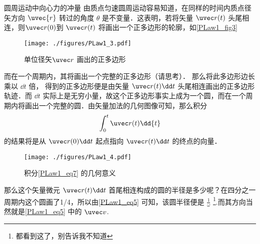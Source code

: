 \begin{example}{圆周运动中向心力的冲量}
由质点匀速圆周运动容易知道，在同样的时间内质点径矢方向 $\uvec{r}$ 转过的角度 $\theta$ 是不变量．这表明，若将矢量 $\uvec r(t)$ 头尾相连，则$\uvec r(0)$到 $\uvec r(t)$ 将画出一个正多边形的轮廓，如\autoref{PLaw1_fig3} 
\begin{figure}[ht]
\centering
\texttt{[image: ./figures/PLaw1\_3.pdf]}
\caption{单位径矢$\uvec r$ 画出的正多边形} \label{PLaw1_fig3}
\end{figure}
而在一个周期内，其将画出一个完整的正多边形（请思考）．
那么将此多边形边长乘以 $\dd t$ 倍， 得到的正多边形便是由矢量 $\uvec r(t)\dd t$ 头尾相连画出的正多边形轨迹．而 $\dd t$ 实际上是无穷小量，故这个正多边形事实上成为一个圆，而在一个周期内将画出一个完整的圆．由矢量加法的几何图像可知，那么积分
\begin{equation}\label{PLaw1_eq7}
\int_{0}^{t}\uvec r(t) \dd{t}
\end{equation}
的结果将是从 $\uvec r(0)\dd t$ 起点指向 $\uvec r(t)\dd t$ 的终点的向量．
\begin{figure}[ht]
\centering
\texttt{[image: ./figures/PLaw1\_4.pdf]}
\caption{积分\autoref{PLaw1_eq7} 的几何意义} \label{PLaw1_fig4}
\end{figure}
那么这个矢量微元 $\uvec r(t)\dd t$ 首尾相连构成的圆的半径是多少呢？在四分之一周期内这个圆画了1/4，所以由\autoref{PLaw1_eq5} 可知，该圆半径便是 $\frac{1}{\omega}$ \footnote{都看到这了，别告诉我不知道}.而其方向当然就是\autoref{PLaw1_eq5} 中的 $\uvec v$.
\end{example}
